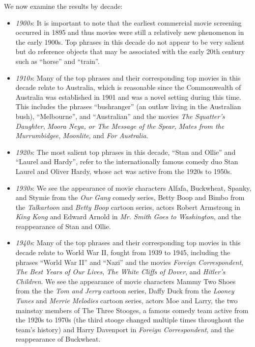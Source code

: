 \documentclass{article}
\begin{document}
\begin{multicols}{2}
We now examine the results by decade:
\begin{itemize}
    \item \textit{1900s}: It is important to note that the earliest commercial movie screening occurred in 1895 and thus movies were still a relatively new phenomenon in the early 1900s. Top phrases in this decade do not appear to be very salient but do reference objects that may be associated with the early 20th century such as ``horse'' and ``train''.
    \item \textit{1910s}: Many of the top phrases and their corresponding top movies in this decade relate to Australia, which is reasonable since the Commonwealth of Australia was established in 1901 and was a novel setting during this time. This includes the phrases ``bushranger'' (an outlaw living in the Australian bush), ``Melbourne'', and ``Australian'' and the movies \textit{The Squatter's Daughter}, \textit{Moora Neya, or The Message of the Spear}, \textit{Mates from the Murrumbidgee}, \textit{Moonlite}, and \textit{For Australia}.
    \item \textit{1920s}: The most salient top phrases in this decade, ``Stan and Ollie'' and ``Laurel and Hardy'', refer to the internationally famous comedy duo Stan Laurel and Oliver Hardy, whose act was active from the 1920s to 1950s.
    \item \textit{1930s}: We see the appearance of movie characters Alfafa, Buckwheat, Spanky, and Stymie from the \textit{Our Gang} comedy series, Betty Boop and Bimbo from the \textit{Talkartoon} and \textit{Betty Boop} cartoon series, actors Robert Armstrong in \textit{King Kong} and Edward Arnold in \textit{Mr. Smith Goes to Washington}, and the reappearance of Stan and Ollie.
    \item \textit{1940s}: Many of the top phrases and their corresponding top movies in this decade relate to World War II, fought from 1939 to 1945, including the phrases ``World War II'' and ``Nazi'' and the movies \textit{Foreign Correspondent}, \textit{The Best Years of Our Lives}, \textit{The White Cliffs of Dover}, and \textit{Hitler's Children}. We see the appearance of movie characters Mammy Two Shoes from the the \textit{Tom and Jerry} cartoon series, Daffy Duck from the \textit{Looney Tunes} and \textit{Merrie Melodies} cartoon series, actors Moe and Larry, the two mainstay members of The Three Stooges, a famous comedy team active from the 1920s to 1970s (the third stooge changed multiple times throughout the team's history) and Harry Davenport in \textit{Foreign Correspondent}, and the reappearance of Buckwheat.

\end{itemize}
\end{multicols}
\end{document}
